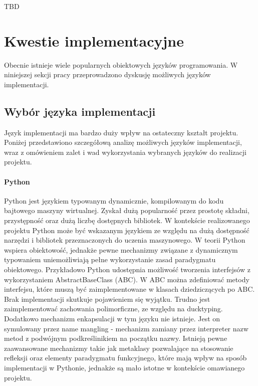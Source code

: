 \documentclass[12pt]{article}
\begin{document}
TBD

\section{Kwestie implementacyjne}

Obecnie istnieje wiele popularnych obiektowych języków programowania. W niniejszej sekcji pracy przeprowadzono dyskusję możliwych języków implementacji.

\subsection{Wybór języka implementacji}

Język implementacji ma bardzo duży wpływ na ostateczny kształt projektu. Poniżej przedstawiono szczegółową analizę możliwych języków implementacji, wraz z omówieniem zalet i wad wykorzystania wybranych języków do realizacji projektu.

\paragraph{Python}
Python jest językiem typowanym dynamicznie, kompilowanym do kodu bajtowego maszyny wirtualnej. Zyskał dużą popularność przez prostotę składni, przystępność oraz dużą liczbę dostępnych bibliotek. W kontekście realizowanego projektu Python może być wskazanym językiem ze względu na dużą dostępność narzędzi i bibliotek przeznaczonych do uczenia maszynowego. W teorii Python wspiera obiektowość, jednakże pewne mechanizmy związane z dynamicznym typowaniem uniemożliwiają pełne wykorzystanie zasad paradygmatu obiektowego. Przykładowo Python udostępnia możliwość tworzenia interfejsów z wykorzystaniem AbstractBaseClass (ABC). W ABC można zdefiniować metody interfejsu, które muszą być zaimplementowane w klasach dziedziczących po ABC. Brak implementacji skutkuje pojawieniem się wyjątku. Trudno jest zaimplementować zachowania polimorficzne, ze względu na ducktyping. Dodatkowo mechanizm enkapsulacji w tym języku nie istnieje. Jest on symulowany przez name mangling - mechanizm zamiany przez interpreter nazw metod z podwójnym podkreślinikiem na początku nazwy. Istnieją pewne zaawansowane mechanizmy takie jak metaklasy pozwalające na stosowanie refleksji oraz elementy paradygmatu funkcyjnego, które mają wpływ na sposób implementacji w Pythonie, jednakże są mało istotne w kontekście omawianego projektu.
\end{document}
